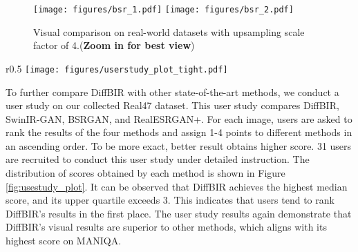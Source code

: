 \documentclass{article}
\begin{document}
\begin{figure}[htbp]
\centering
\texttt{[image: figures/bsr\_1.pdf]}
\texttt{[image: figures/bsr\_2.pdf]}
\vspace{-0.5em}
\caption{\small Visual comparison on real-world datasets with upsampling scale factor of 4.(\textbf{Zoom in for best view})}
\label{fig:general_real}
\vspace{-2em}
\end{figure}

\begin{wrapfigure}[17]{r}{0.5\textwidth}
\centering
\texttt{[image: figures/userstudy\_plot\_tight.pdf]}
  \caption{\small The distribution of scores obtained by SwinIR-GAN, Real-ESRGAN+, BSRGAN, and our DiffBIR in user study.}
  \label{fig:usestudy_plot}
\end{wrapfigure}

To further compare DiffBIR with other state-of-the-art methods, we conduct a user study on our collected Real47 dataset. This user study compares DiffBIR, SwinIR-GAN, BSRGAN, and RealESRGAN+. For each image, users are asked to rank the results of the four methods and assign 1-4 points to different methods in an ascending order. To be more exact, better result obtains higher score. 
31 users are recruited to conduct this user study under detailed instruction. The distribution of scores obtained by each method is shown in Figure \ref{fig:usestudy_plot}. It can be observed that DiffBIR achieves the highest median score, and its upper quartile exceeds 3. This indicates that users tend to rank DiffBIR's results in the first place. The user study results again demonstrate that DiffBIR's visual results are superior to other methods, which aligns with its highest score on MANIQA.
\end{document}

